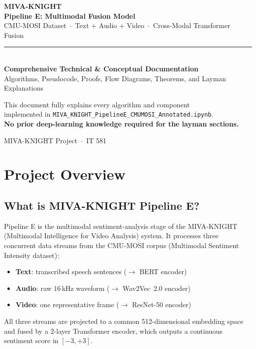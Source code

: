 \documentclass[12pt,a4paper]{article}
\theoremstyle{definition}
\begin{document}
\begin{titlepage}
  \centering
  \vspace*{2cm}
  {\Huge\bfseries\color{headerblue} MIVA-KNIGHT\\[0.4em]
  \Large Pipeline E: Multimodal Fusion Model}\\[1.5em]
  {\large\color{darkgray} CMU-MOSI Dataset~$\cdot$~Text + Audio + Video~$\cdot$~Cross-Modal Transformer Fusion}\\[0.8em]
  \rule{12cm}{1.5pt}\\[1em]
  {\large\bfseries Comprehensive Technical \& Conceptual Documentation}\\[0.5em]
  {\normalsize Algorithms, Pseudocode, Proofs, Flow Diagrams, Theorems, and Layman Explanations}\\[3em]
  \begin{tcolorbox}[colback=lightblue!60, colframe=technicalblue, width=10cm]
    \centering\small
    This document fully explains every algorithm and component\\
    implemented in \texttt{MIVA\_KNIGHT\_PipelineE\_CMUMOSI\_Annotated.ipynb}.\\[0.3em]
    \textbf{No prior deep-learning knowledge required for the layman sections.}
  \end{tcolorbox}
  \vfill
  {\normalsize MIVA-KNIGHT Project~$\cdot$~IT 581}
\end{titlepage}

\tableofcontents
\newpage

\section{Project Overview}

\subsection{What is MIVA-KNIGHT Pipeline E?}

\begin{technicalbox}
Pipeline E is the multimodal sentiment-analysis stage of the MIVA-KNIGHT (Multimodal Intelligence for Video Analysis) system. It processes three concurrent data streams from the CMU-MOSI corpus (Multimodal Sentiment Intensity dataset):
\begin{itemize}[nosep]
  \item \textbf{Text}: transcribed speech sentences ($\to$ BERT encoder)
  \item \textbf{Audio}: raw 16\,kHz waveform ($\to$ Wav2Vec~2.0 encoder)
  \item \textbf{Video}: one representative frame ($\to$ ResNet-50 encoder)
\end{itemize}
All three streams are projected to a common 512-dimensional embedding space and fused by a 2-layer Transformer encoder, which outputs a continuous sentiment score in $[-3, +3]$.
\end{technicalbox}
\end{document}
